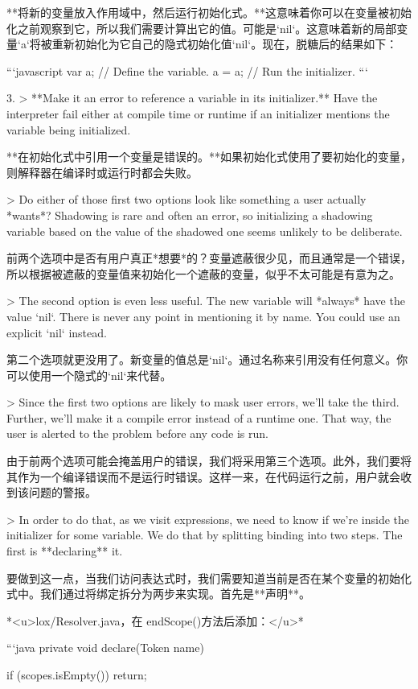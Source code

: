 \documentclass[cn,11pt,chinese]{elegantbook}
\begin{document}
{{{{{{{{{{{{{   **将新的变量放入作用域中，然后运行初始化式。**这意味着你可以在变量被初始化之前观察到它，所以我们需要计算出它的值。可能是`nil`。这意味着新的局部变量`a`将被重新初始化为它自己的隐式初始化值`nil`。现在，脱糖后的结果如下：

   ```javascript
   var a; // Define the variable.
   a = a; // Run the initializer.
   ```

3. > **Make it an error to reference a variable in its initializer.** Have the interpreter fail either at compile time or runtime if an initializer mentions the variable being initialized.

   **在初始化式中引用一个变量是错误的。**如果初始化式使用了要初始化的变量，则解释器在编译时或运行时都会失败。

> Do either of those first two options look like something a user actually *wants*? Shadowing is rare and often an error, so initializing a shadowing variable based on the value of the shadowed one seems unlikely to be deliberate.

前两个选项中是否有用户真正*想要*的？变量遮蔽很少见，而且通常是一个错误，所以根据被遮蔽的变量值来初始化一个遮蔽的变量，似乎不太可能是有意为之。

> The second option is even less useful. The new variable will *always* have the value `nil`. There is never any point in mentioning it by name. You could use an explicit `nil` instead.

第二个选项就更没用了。新变量的值总是`nil`。通过名称来引用没有任何意义。你可以使用一个隐式的`nil`来代替。

> Since the first two options are likely to mask user errors, we’ll take the third. Further, we’ll make it a compile error instead of a runtime one. That way, the user is alerted to the problem before any code is run.

由于前两个选项可能会掩盖用户的错误，我们将采用第三个选项。此外，我们要将其作为一个编译错误而不是运行时错误。这样一来，在代码运行之前，用户就会收到该问题的警报。

> In order to do that, as we visit expressions, we need to know if we’re inside the initializer for some variable. We do that by splitting binding into two steps. The first is **declaring** it.

要做到这一点，当我们访问表达式时，我们需要知道当前是否在某个变量的初始化式中。我们通过将绑定拆分为两步来实现。首先是**声明**。

*<u>lox/Resolver.java，在 endScope()方法后添加：</u>*

```java
  private void declare(Token name) {
    if (scopes.isEmpty()) return;

}}}}}}}}}}}}}}
\end{document}
